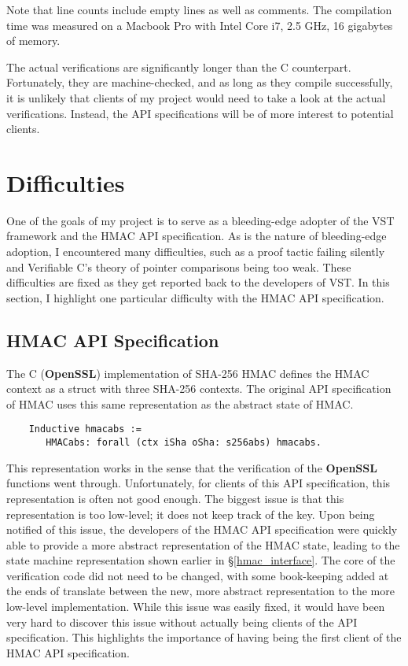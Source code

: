 \documentclass[pageno]{jpaper}
\newcommand{\stdtitle}[1]{\textbf{#1}}
\begin{document}
Note that line counts include empty lines as well as comments. The compilation time was measured on a Macbook Pro with Intel Core i7, 2.5 GHz, 16 gigabytes of memory.

The actual verifications are significantly longer than the C counterpart. Fortunately, they are machine-checked, and as long as they compile successfully, it is unlikely that clients of my project would need to take a look at the actual verifications. Instead, the API specifications will be of more interest to potential clients.

\section{Difficulties}

One of the goals of my project is to serve as a bleeding-edge adopter of the VST framework and the HMAC API specification. As is the nature of bleeding-edge adoption, I encountered many difficulties, such as a proof tactic failing silently and Verifiable C's theory of pointer comparisons being too weak. These difficulties are fixed as they get reported back to the developers of VST. In this section, I highlight one particular difficulty with the HMAC API specification.


\subsection{HMAC API Specification} \label{oldhmac}

The C (\stdtitle{OpenSSL}) implementation of SHA-256 HMAC defines the HMAC context as a struct with three SHA-256 contexts. The original API specification of HMAC \cite{hmac} uses this same representation as the abstract state of HMAC.

\begin{lstlisting}
    Inductive hmacabs :=
       HMACabs: forall (ctx iSha oSha: s256abs) hmacabs.
\end{lstlisting}

This representation works in the sense that the verification of the \stdtitle{OpenSSL} functions went through. Unfortunately, for clients of this API specification, this representation is often not good enough. The biggest issue is that this representation is too low-level; it does not keep track of the key. Upon being notified of this issue, the developers of the HMAC API specification were quickly able to provide a more abstract representation of the HMAC state, leading to the state machine representation shown earlier in \S \ref{hmac_interface}. The core of the verification code did not need to be changed, with some book-keeping added at the ends of translate between the new, more abstract representation to the more low-level implementation. While this issue was easily fixed, it would have been very hard to discover this issue without actually being clients of the API specification. This highlights the importance of having being the first client of the HMAC API specification.
\end{document}
